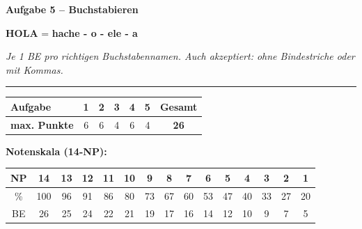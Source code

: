 \documentclass[11pt, a4paper]{article}
\newcommand{\punktebox}[1]{\hfill\fbox{\small \_\_\_/#1}}
\newcommand{\es}[1]{\textcolor{spanisch}{\textbf{#1}}}
\newcommand{\lsg}[1]{\textcolor{loesung}{\textbf{#1}}}
\begin{document}
\vspace{15pt}


\noindent\textbf{\textcolor{spanisch}{Aufgabe 5 -- Buchstabieren}} \punktebox{4}

\vspace{10pt}

\noindent
\es{HOLA} = \lsg{hache - o - ele - a}

\vspace{5pt}
\textit{Je 1 BE pro richtigen Buchstabennamen. Auch akzeptiert: ohne Bindestriche oder mit Kommas.}


\vspace{20pt}
\hrule
\vspace{10pt}

\noindent
\begin{tabularx}{\textwidth}{|X|c|c|c|c|c||c|}
\hline
\textbf{Aufgabe} & 1 & 2 & 3 & 4 & 5 & \textbf{Gesamt} \\
\hline
\textbf{max. Punkte} & 6 & 6 & 4 & 6 & 4 & \textbf{26} \\
\hline
\end{tabularx}

\vspace{15pt}

\noindent\textbf{Notenskala (14-NP):}

\vspace{5pt}

\begin{tabular}{|c|c|c|c|c|c|c|c|c|c|c|c|c|c|c|}
\hline
NP & 14 & 13 & 12 & 11 & 10 & 9 & 8 & 7 & 6 & 5 & 4 & 3 & 2 & 1 \\
\hline
\% & 100 & 96 & 91 & 86 & 80 & 73 & 67 & 60 & 53 & 47 & 40 & 33 & 27 & 20 \\
\hline
BE & 26 & 25 & 24 & 22 & 21 & 19 & 17 & 16 & 14 & 12 & 10 & 9 & 7 & 5 \\
\hline
\end{tabular}
\end{document}

